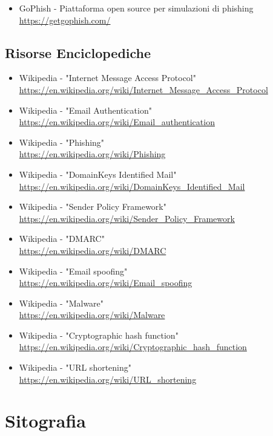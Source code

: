 \documentclass{article}
\begin{document}
\begin{itemize}
    \item GoPhish - Piattaforma open source per simulazioni di phishing \\
    \url{https://getgophish.com/}
\end{itemize}

\subsection{Risorse Enciclopediche}

\begin{itemize}
    \item Wikipedia - "Internet Message Access Protocol" \\
    \url{https://en.wikipedia.org/wiki/Internet_Message_Access_Protocol}
    \item Wikipedia - "Email Authentication" \\
    \url{https://en.wikipedia.org/wiki/Email_authentication}
    \item Wikipedia - "Phishing" \\
    \url{https://en.wikipedia.org/wiki/Phishing}
    \item Wikipedia - "DomainKeys Identified Mail" \\
    \url{https://en.wikipedia.org/wiki/DomainKeys_Identified_Mail}
    \item Wikipedia - "Sender Policy Framework" \\
    \url{https://en.wikipedia.org/wiki/Sender_Policy_Framework}
    \item Wikipedia - "DMARC" \\
    \url{https://en.wikipedia.org/wiki/DMARC}
    \item Wikipedia - "Email spoofing" \\
    \url{https://en.wikipedia.org/wiki/Email_spoofing}
    \item Wikipedia - "Malware" \\
    \url{https://en.wikipedia.org/wiki/Malware}
    \item Wikipedia - "Cryptographic hash function" \\
    \url{https://en.wikipedia.org/wiki/Cryptographic_hash_function}
    \item Wikipedia - "URL shortening" \\
    \url{https://en.wikipedia.org/wiki/URL_shortening}
\end{itemize}


\section{Sitografia}
\end{document}
